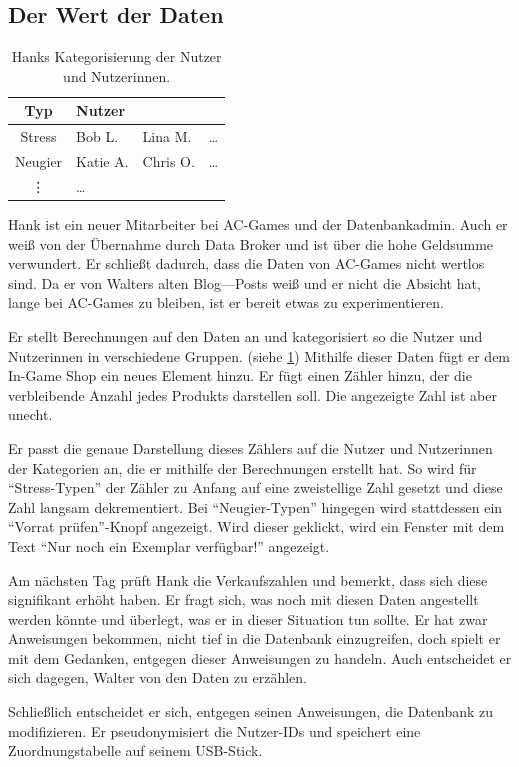 \subsection{Der Wert der Daten}

\begin{table}
   \begin{tabular}{c|lll} 
        \textbf{Typ} & \textbf{Nutzer} \\\hline
        Stress & Bob L. & Lina M. & \dots \\\hline
        Neugier & Katie A. & Chris O. & \dots \\ \vdots & \dots & & 
    \end{tabular} 
    \caption{Hanks Kategorisierung der Nutzer und Nutzerinnen.}
    \label{tab:03:categories}
\end{table}

Hank ist ein neuer Mitarbeiter bei AC-Games und der Datenbankadmin.
Auch er weiß von der Übernahme durch Data Broker und ist über die hohe Geldsumme verwundert.
Er schließt dadurch, dass die Daten von AC-Games nicht wertlos sind.
Da er von Walters alten Blog—Posts weiß und er nicht die Absicht hat, lange bei AC-Games zu bleiben,
ist er bereit etwas zu experimentieren.

Er stellt Berechnungen auf den Daten an und kategorisiert so die Nutzer und Nutzerinnen in verschiedene Gruppen. (siehe \cref{tab:03:categories})
Mithilfe dieser Daten fügt er dem In-Game Shop ein neues Element hinzu.
Er fügt einen Zähler hinzu, der die verbleibende Anzahl jedes Produkts darstellen soll.
Die angezeigte Zahl ist aber unecht.

Er passt die genaue Darstellung dieses Zählers auf die Nutzer und Nutzerinnen der Kategorien an,
die er mithilfe der Berechnungen erstellt hat.
So wird für \enquote{Stress-Typen} der Zähler zu Anfang auf eine zweistellige Zahl gesetzt und diese Zahl langsam dekrementiert.
Bei \enquote{Neugier-Typen} hingegen wird stattdessen ein \enquote{Vorrat prüfen}-Knopf angezeigt.
Wird dieser geklickt, wird ein Fenster mit dem Text \enquote{Nur noch ein Exemplar verfügbar!} angezeigt.

Am nächsten Tag prüft Hank die Verkaufszahlen und bemerkt, dass sich diese signifikant erhöht haben.
Er fragt sich, was noch mit diesen Daten angestellt werden könnte und überlegt, was er in dieser Situation tun sollte.
Er hat zwar Anweisungen bekommen, nicht tief in die Datenbank einzugreifen,
doch spielt er mit dem Gedanken, entgegen dieser Anweisungen zu handeln.
Auch entscheidet er sich dagegen, Walter von den Daten zu erzählen.

Schließlich entscheidet er sich, entgegen seinen Anweisungen, die Datenbank zu modifizieren.
Er pseudonymisiert die Nutzer-IDs und speichert eine Zuordnungstabelle auf seinem USB-Stick. 